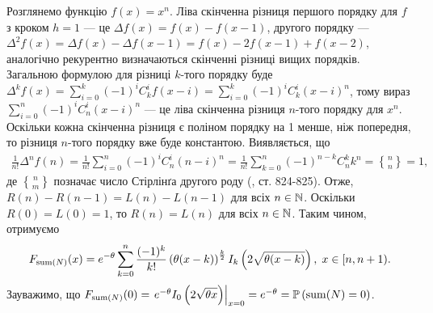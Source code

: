 Розглянемо функцію $f(x) = x^n$.
Ліва скінченна різниця першого порядку для $f$ з кроком $h=1$ --- це 
$\Delta f(x) = f(x) - f(x-1)$, другого порядку --- $\Delta^2 f(x) = \Delta f(x) - \Delta f(x-1) = 
f(x) - 2f(x-1) + f(x-2)$,
аналогічно рекурентно визначаються скінченні різниці вищих порядків.
Загальною формулою для різниці $k$-того порядку буде
$\Delta^k f(x) = \sum_{i=0}^k (-1)^i C_k^i f(x-i) = \sum_{i=0}^k (-1)^i C_k^i (x - i)^n$,
тому вираз $\sum_{i=0}^n (-1)^i C_n^i (x-i)^n$ --- це ліва скінченна різниця $n$-того порядку для
$x^n$. Оскільки кожна скінченна різниця є поліном порядку на 1 менше, ніж попередня,
то різниця $n$-того порядку вже буде константою. Виявляється,
що
\begin{gather*}
    \frac{1}{n!} \Delta^n f(n) = 
    \frac{1}{n!} \sum_{i=0}^n (-1)^i C_n^i (n - i)^n = 
    \frac{1}{n!} \sum_{k=0}^n (-1)^{n-k} C_n^k k^n = {n\brace n} = 1,
\end{gather*}
де ${n \brace m}$ позначає число Стірлінґа другого роду (\cite{Abramowitz_Stegun}, ст. 824-825).
Отже, $R(n) - R(n-1) = L(n) - L(n-1)$ для всіх $n \in \mathbb{N}$. Оскільки
$R(0) = L(0) = 1$, то $R(n) = L(n)$ для всіх $n \in \mathbb{N}$.
Таким чином, отримуємо 
\begin{gather}
    F_{\operatorname{sum}(N)}(x) = e^{-\theta}
    \sum_{k=0}^{n} \frac{(-1)^k}{k!}
    \left(\theta (x - k)\right)^{\frac{k}{2}} I_k\left(2\sqrt{\theta(x-k)}\right), \; x \in [n, n+1).
\end{gather}
Зауважимо, що 
$F_{\operatorname{sum}(N)}(0) = \left.e^{-\theta} I_0\left(2 \sqrt{\theta x}\right) \right|_{x = 0} = e^{-\theta} = \mathbb{P}\left(\operatorname{sum}(N) = 0\right)$.

